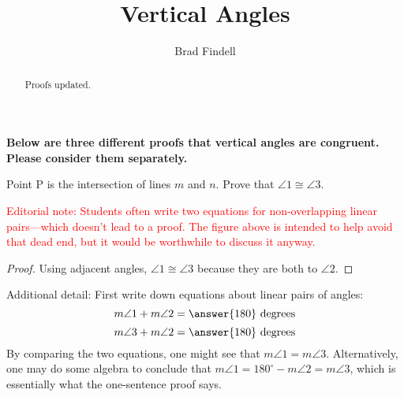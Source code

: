 \documentclass[nooutcomes]{ximera}
\title{Vertical Angles}
\author{Brad Findell}
\begin{document}
\begin{abstract}
Proofs updated. 
\end{abstract}
\maketitle

\textbf{Below are three different proofs that vertical angles are congruent.  Please consider them separately.}

\begin{problem}
Point P is the intersection of lines $m$ and $n$.  Prove that $\angle 1\cong \angle 3$.  

\begin{image}
\end{image}

{\textcolor{red}{Editorial note: Students often write two equations for non-overlapping linear pairs---which doesn't lead to a proof.  The figure above is intended to help avoid that dead end, but it would be worthwhile to discuss it anyway.}}

\begin{proof}
Using adjacent angles, $\angle 1\cong \angle 3$ because they are both  to $\angle 2$.
\end{proof}

\begin{feedback}[correct]
Additional detail: First write down equations about linear pairs of angles: 
\[
m\angle 1 + m\angle 2 = \answer{180} \textrm{ degrees}
\]
\[
m\angle 3 + m\angle 2 = \answer{180} \textrm{ degrees}
\]
By comparing the two equations, one might see that $m\angle 1=m\angle 3$.   
Alternatively, one may do some algebra to conclude that $m\angle 1 = 180^\circ - m\angle 2 = m\angle 3$, which is essentially what the one-sentence proof says.
\end{feedback}

\end{problem}
\end{document}
